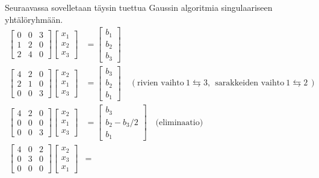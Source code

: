 \begin{Exa}
Seuraavassa sovelletaan täysin tuettua Gaussin algoritmia singulaariseen yhtälöryhmään.
\begin{align*}
\begin{bmatrix}
0&0&3 \\
1&2&0 \\
2&4&0
\end{bmatrix}
\begin{bmatrix} x_1 \\ x_2 \\ x_3 \end{bmatrix} &= 
\begin{bmatrix} b_1 \\ b_2 \\ b_3 \end{bmatrix} \\[5mm]
\begin{bmatrix}
4&2&0 \\
2&1&0 \\
0&0&3
\end{bmatrix}
\begin{bmatrix} x_2 \\ x_1 \\ x_3 \end{bmatrix} &= 
\begin{bmatrix} b_3 \\ b_2 \\ b_1 \end{bmatrix} 
\quad (\text{rivien vaihto}\ 1 \leftrightarrows 3,\ \ 
\text{sarakkeiden vaihto}\ 1 \leftrightarrows 2\,) \\[5mm]
\begin{bmatrix}
4&2&0 \\
0&0&0 \\
0&0&3
\end{bmatrix}
\begin{bmatrix} x_2 \\ x_1 \\ x_3 \end{bmatrix} &= 
\begin{bmatrix} b_3 \\ b_2 - b_3/2 \\ b_1 \end{bmatrix} 
\quad \text{(eliminaatio)} \\[5mm]
\begin{bmatrix}
4&0&2 \\
0&3&0 \\
0&0&0
\end{bmatrix}
\begin{bmatrix} x_2 \\ x_3 \\ x_1 \end{bmatrix} &= 

\end{align*}
\end{Exa}
